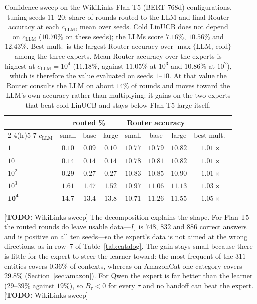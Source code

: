 \documentclass{article}
\theoremstyle{definition}
\theoremstyle{remark}
\theoremstyle{remark}
\newcommand{\todo}[1]{\textcolor{red!70!black}{[\textbf{TODO:} #1]}}
\begin{document}
\begin{table}[h]
\centering
\caption{Confidence sweep on the WikiLinks Flan-T5 (BERT-768d) configurations,
tuning seeds $11$--$20$: share of rounds routed to the LLM and final Router
accuracy at each $c_{\mathrm{LLM}}$, mean over seeds. Cold LinUCB does not depend on $c_{\mathrm{LLM}}$
($10.70\%$ on these seeds); the LLMs score $7.16\%$, $10.56\%$ and $12.43\%$.
Best mult.\ is the largest Router accuracy over $\max\{$LLM, cold$\}$ among the
three experts. Mean Router accuracy over the experts is highest at
$c_{\mathrm{LLM}}=10^4$ ($11.18\%$, against $11.05\%$ at $10^3$ and $10.86\%$ at $10^2$),
which is therefore the value evaluated on seeds $1$--$10$. At that value the
Router consults the LLM on about $14\%$ of rounds and moves toward the LLM's
own accuracy rather than multiplying: it gains on the two experts that beat
cold LinUCB and stays below Flan-T5-large itself.}
\label{tab:wiki-csweep}
\scriptsize
\setlength{\tabcolsep}{4pt}
\begin{tabular}{@{}lccccccc@{}}
\toprule
& \multicolumn{3}{c}{routed \%} & \multicolumn{3}{c}{Router accuracy} & \\
\cmidrule(lr){2-4}\cmidrule(lr){5-7}
$c_{\mathrm{LLM}}$ & small & base & large & small & base & large & best mult.\ \\
\midrule
$1$ & $0.10$ & $0.09$ & $0.10$ & $10.77$ & $10.79$ & $10.82$ & $1.01\times$ \\
$10$ & $0.14$ & $0.14$ & $0.14$ & $10.78$ & $10.81$ & $10.82$ & $1.01\times$ \\
$10^2$ & $0.29$ & $0.27$ & $0.27$ & $10.83$ & $10.85$ & $10.90$ & $1.01\times$ \\
$10^3$ & $1.61$ & $1.47$ & $1.52$ & $10.97$ & $11.06$ & $11.13$ & $1.03\times$ \\
$\mathbf{10^4}$ & $14.7$ & $13.4$ & $13.8$ & $10.71$ & $11.26$ & $\mathbf{11.55}$ & $\mathbf{1.05\times}$ \\
\bottomrule
\end{tabular}
\end{table}

\todo{WikiLinks sweep} The decomposition explains the shape. For Flan-T5 the routed rounds do leave
usable data---$I_\tau$ is $748$, $832$ and $886$ correct answers and is
positive on all ten seeds---so the expert's data is not aimed at the wrong
directions, as in row~7 of Table~\ref{tab:catalog}. The gain stays small
because there is little for the expert to steer the learner toward: the most
frequent of the $311$ entities covers $0.36\%$ of contexts, whereas on
AmazonCat one category covers $29.8\%$ (Section~\ref{sec:amazon}). For Qwen the expert is far better than the
learner ($29$--$39\%$ against $19\%$), so $B_\tau<0$ for every $\tau$ and no
handoff can beat the expert. \todo{WikiLinks sweep}
\end{document}
